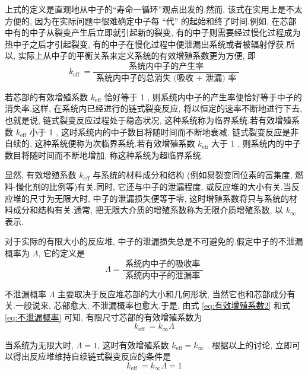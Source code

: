 \documentclass{Sichuan Normal University}
\begin{document}
上式的定义是直观地从中子的“寿命一循环”观点出发的.然而, 该式在实用上是不太方便的, 因为在实际问题中很难确定中子每 “代” 的起始和终了时间.例如, 在芯部中有的中子从裂变产生后立即就引起新的裂变, 有的中子则需要经过慢化过程成为热中子之后才引起裂变, 有的中子在慢化过程中便泄漏出系统或者被辐射俘获.所以, 实际上从中子的平衡关系来定义系统的有效增殖系数更为方便, 即
\begin{equation}
    k_{\text {eff }}=\frac{\text { 系统内中子的产生率 }}{\text { 系统内中子的总消失 (吸收 }+ \text { 泄漏) 率 }}
    \label{eq:有效增殖系数2}
\end{equation}

若芯部的有效增殖系数 $k_{\mathrm{eff}}$ 恰好等于 1 , 则系统内中子的产生率便恰好等于中子的消失率.这样, 在系统内已经进行的链式裂变反应, 将以恒定的速率不断地进行下去, 也就是说, 链式裂变反应过程处于稳态状况, 这种系统称为临界系统.若有效增殖系数 $k_{\mathrm{eff}}$ 小于 1 , 这时系统内的中子数目将随时间而不断地衰减, 链式裂变反应是非自续的, 这种系统便称为次临界系统.若有效增殖系数 $k_{\mathrm{efi}}$ 大于 1 , 则系统内的中子数目将随时间而不断地增加, 称这种系统为超临界系统.

显然, 有效增殖系数 $k_{\mathrm{eff}}$ 与系统的材料成分和结构 (例如易裂变同位素的富集度, 燃料-慢化剂的比例等)有关.同时, 它还与中子的泄漏程度, 或反应堆的大小有关.当反应堆的尺寸为无限大时, 中子的泄漏损失便等于零, 这时增殖系数将只与系统的材料成分和结构有关.通常, 把无限大介质的增殖系数称为无限介质增殖系数, 以 $k_{\infty}$ 表示.

对于实际的有限大小的反应堆, 中子的泄漏损失总是不可避免的.假定中子的不泄漏概率为 $\Lambda$, 它的定义是
\begin{equation}
    \Lambda=\frac{\text { 系统内中子的吸收率 }}{\text { 系统内中子的泄漏率 }}
    \label{eq:不泄漏概率}
\end{equation}

不泄漏概率 $\Lambda$ 主要取决于反应堆芯部的大小和几何形状, 当然它也和芯部成分有关.一般说来, 芯部愈大, 不泄漏概率也愈大.于是, 由式 \eqref{eq:有效增殖系数2} 和式 \eqref{eq:不泄漏概率} 可知, 有限尺寸芯部的有效增殖系数为
\begin{equation}
    k_{\text {eff }}=k_{\infty} \Lambda
    \label{eq:有效增殖系数3}
\end{equation}

当系统为无限大时, $\Lambda=1$, 这时有效增殖系数 $k_{\mathrm{eff}}=k_{\infty}$ .
根据以上的讨论, 立即可以得出反应堆维持自续链式裂变反应的条件是
\begin{equation}
    k_{\text {eff }}=k_{\infty} \Lambda=1
    \label{eq:反应堆维持自续链式裂变反应的条件}
\end{equation}
\end{document}
